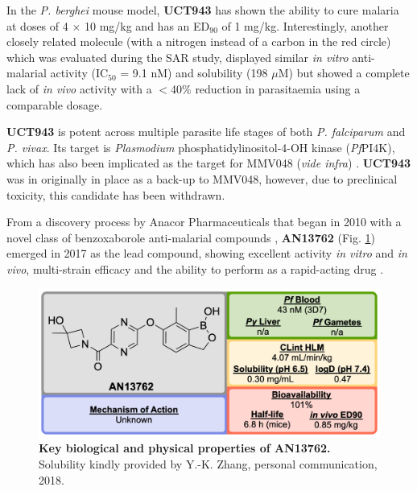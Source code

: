 \documentclass[twocolumn]{bmcart}%
\begin{document}
In the \textit{P. berghei} mouse model, \textbf{UCT943} has shown the ability to cure malaria at doses of 4 $\times$ 10 mg/kg and has an ED$_{90}$ of 1 mg/kg. Interestingly, another closely related molecule (with a nitrogen instead of a carbon in the red circle) which was evaluated during the SAR study, displayed similar \textit{in vitro} anti-malarial activity (IC$_{50}$ = 9.1 nM) and solubility (198 $\mu$M) but showed a complete lack of \textit{in vivo} activity with a $<$40\% reduction in parasitaemia using a comparable dosage.

\textbf{UCT943} is potent across multiple parasite life stages of both \textit{P. falciparum} and \textit{P. vivax}. Its target is \textit{Plasmodium} phosphatidylinositol-4-OH kinase (\textit{Pf}PI4K), which has also been implicated as the target for MMV048 (\textit{vide infra}) \cite{McNamara2013}. \textbf{UCT943} was in originally in place as a back-up to MMV048, however, due to preclinical toxicity, this candidate has been withdrawn.

\hrulefill

From a discovery process by Anacor Pharmaceuticals that began in 2010 with a novel class of benzoxaborole anti-malarial compounds \cite{Zhang2011}, \textbf{AN13762} (Fig. \ref{Figure12}) emerged in 2017 as the lead compound, showing excellent activity \textit{in vitro} and \textit{in vivo}, multi-strain efficacy and the ability to perform as a rapid-acting drug \cite{Zhang2017}.

\begin{figure}[h]
	\includegraphics [scale=0.575] {Figure12}
	\caption{{\bf Key biological and physical properties of AN13762.} Solubility kindly provided by Y.-K. Zhang, personal communication, 2018.}
	\label{Figure12}
\end{figure}
\end{document}
